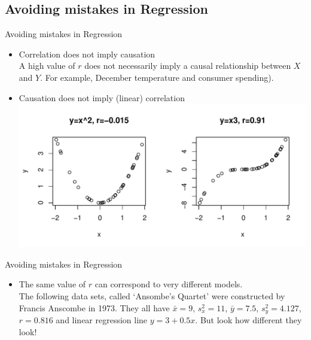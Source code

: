 \documentclass[t,xcolor=pdftex,dvipsnames,table]{beamer}
\makeatletter
\def\maxwidth{ %
  \ifdim\Gin@nat@width>\linewidth
    \linewidth
  \else
    \Gin@nat@width
  \fi
}
\newenvironment{knitrout}{}{} %
\makeatother
\begin{document}
\subsection{Avoiding mistakes in Regression}
\begin{frame}[fragile]{Avoiding mistakes in Regression}

\begin{itemize}
\item Correlation does not imply causation \\
A high value of $r$ does not necessarily imply a causal relationship between $X$ and $Y$.  For example, December temperature and consumer spending).

\vspace{.5cm}
\item Causation does not imply (linear) correlation \\

\begin{knitrout}
\color{fgcolor}
\includegraphics[width=\maxwidth]{figure/unnamed-chunk-11-1} 

\end{knitrout}
\end{itemize}
\end{frame} 


\begin{frame}[fragile]{Avoiding mistakes in Regression}
\begin{itemize}
\item The same value of $r$ can correspond to very different models.  \\

\vspace{.5cm}
The following data sets, called `Ansombe's Quartet' were constructed by Francis Anscombe in 1973. They all have $\bar{x}= 9$, $s_{x}^2=11$, $\bar{y} = 7.5$, $s_{y}^2 = 4.127$, $r=0.816$ and linear regression line $y=3+0.5x$. But look how different they look!
\end{itemize}

\href{https://en.wikipedia.org/wiki/Anscombes_quartet}{}

\href{http://data.heapanalytics.com/anscombes-quartet-and-why-summary-statistics-dont-tell-the-whole-story}{}  %
\end{frame} 
\end{document}
